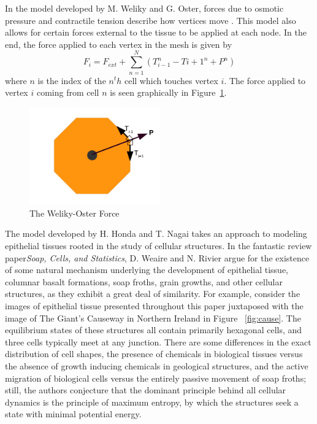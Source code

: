 In the model developed by M. Weliky and G. Oster, forces due to osmotic pressure and contractile tension describe how vertices move \cite{WO}. This model also allows for certain forces external to the tissue to be applied at each node. In the end, the force applied to each vertex in the mesh is given by
\begin{equation*}
F_i = F_{ext}+\sum\limits_{n=1}^N(T_{i-1}^n - T{i+1}^n + P^n)
\end{equation*}
where $n$ is the index of the $n^th$ cell which touches vertex $i$. The force applied to vertex $i$ coming from cell $n$  is seen graphically in Figure~\ref{fig:WO}.
\begin{figure}[h]
\centering
\includegraphics[width=0.5\textwidth]{../diagrams/welikyoster.png}
\caption{The Weliky-Oster Force}
\label{fig:WO}
\end{figure}

The model developed by H. Honda and T. Nagai takes an approach to modeling epithelial tissues rooted in the study of cellular structures.  In the fantastic review paper\emph{Soap, Cells, and Statistics}, D. Weaire and N. Rivier argue for the existence of some natural mechanism underlying the development of epithelial tissue, columnar basalt formations, soap froths, grain growths, and other cellular structures, as they exhibit a great deal of similarity. For example, consider the images of epithelial tissue presented throughout this paper juxtaposed with the image of The Giant's Causeway in Northern Ireland in Figure ~\ref{fig:cause}. The equilibrium states of these structures all contain primarily hexagonal cells, and three cells typically meet at any junction. There are some differences in the exact distribution of cell shapes, the presence of chemicals in biological tissues versus the absence of growth inducing chemicals in geological structures, and the active migration of biological cells versus the entirely passive movement of soap froths; still, the authors conjecture that the dominant principle behind all cellular dynamics is the principle of maximum entropy, by which the structures seek a state with minimal potential energy.

